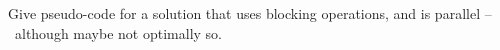   Give pseudo-code for a solution that uses blocking operations, and is
  parallel --~although maybe not optimally so.
